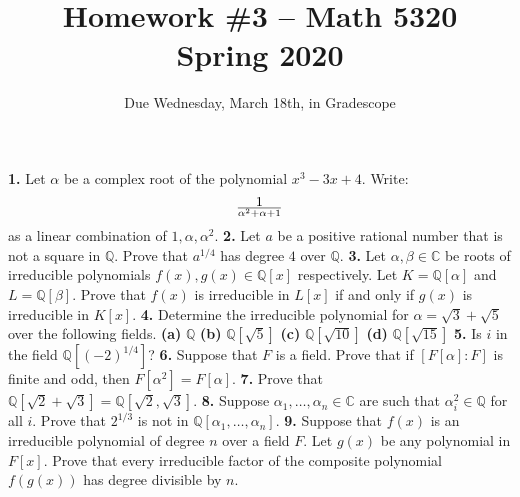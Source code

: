 \documentclass[10pt]{amsart}
\theoremstyle{theorem}
\newcommand{\bQ}{\mathbb{Q}}
\newcommand{\bC}{\mathbb{C}}
\begin{document}
\title{Homework \#3 -- Math 5320\\Spring 2020}
\author{Due Wednesday, March 18th, in Gradescope}

\maketitle


\noindent
{\bf 1.}  Let $\alpha$ be a complex root of the polynomial $x^3 - 3x + 4$.  Write:
\[
    1 \over \alpha^2 + \alpha + 1
\]
as a linear combination of $1, \alpha, \alpha^2$.  
\newpage
\noindent
{\bf 2.}  Let $a$ be a positive rational number that is not a square in $\bQ$.  Prove that $a^{1/4}$ has degree $4$ over $\bQ$.
\newpage
\noindent
{\bf 3.}  Let $\alpha, \beta \in \bC$ be roots of irreducible polynomials $f(x), g(x) \in \bQ[x]$ respectively.  Let $K = \bQ[\alpha]$ and $L = \bQ[\beta]$.  Prove that $f(x)$ is irreducible in $L[x]$ if and only if $g(x)$ is irreducible in $K[x]$.  
\newpage
\noindent
{\bf 4.}  Determine the irreducible polynomial for $\alpha = \sqrt{3} + \sqrt{5}$ over the following fields.
{\bf (a)}  $\bQ$
\vskip 3pt
{\bf (b)}  $\bQ[\sqrt{5}]$
\vskip 3pt
{\bf (c)}  $\bQ[\sqrt{10}]$
\vskip 3pt
{\bf (d)}  $\bQ[\sqrt{15}]$
\newpage
\noindent
{\bf 5.}  Is $i$ in the field $\bQ[(-2)^{1/4}]$?
\newpage
\noindent
{\bf 6.}  Suppose that $F$ is a field.  Prove that if $[F[\alpha] : F]$ is finite and odd, then $F[\alpha^2] = F[\alpha]$.
\newpage
\noindent
{\bf 7.}  Prove that $\bQ[\sqrt{2} + \sqrt{3}] = \bQ[\sqrt{2}, \sqrt{3}]$.
\newpage
\noindent
{\bf 8.}  Suppose $\alpha_1, \dots, \alpha_n \in \bC$ are such that $\alpha_i^2 \in \bQ$ for all $i$.  Prove that $2^{1/3}$ is not in $\bQ[\alpha_1, \dots, \alpha_n]$.
\newpage
\noindent
{\bf 9.}  Suppose that $f(x)$ is an irreducible polynomial of degree $n$ over a field $F$.  Let $g(x)$ be any polynomial in $F[x]$.  Prove that every irreducible factor of the composite polynomial $f(g(x))$ has degree divisible by $n$.  
\end{document}
